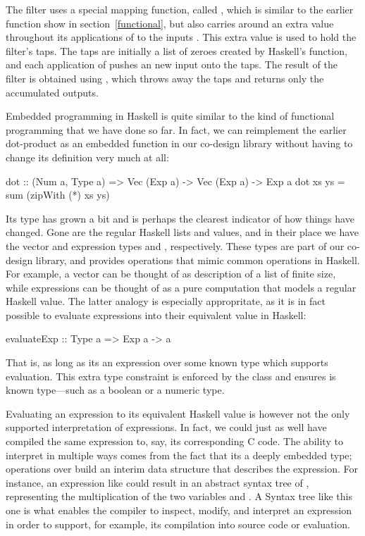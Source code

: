 \documentclass[../main.tex]{subfiles}
\begin{document}
The filter uses a special mapping function, called , which is similar to the earlier  function show in section~\ref{functional}, but also carries around an extra value throughout its applications of  to the inputs . This extra value is used to hold the filter's taps. The taps are initially a list of zeroes created by Haskell's  function, and each application of  pushes an new input onto the taps. The result of the filter is obtained using , which throws away the taps and returns only the accumulated outputs.

Embedded programming in Haskell is quite similar to the kind of functional programming that we have done so far. In fact, we can reimplement the earlier dot-product as an embedded function in our co-design library without having to change its definition very much at all:

\begin{code}
dot :: (Num a, Type a) => Vec (Exp a) -> Vec (Exp a) -> Exp a
dot xs ys = sum (zipWith (*) xs ys)
\end{code}

\noindent Its type has grown a bit and is perhaps the clearest indicator of how things have changed. Gone are the regular Haskell lists and values, and in their place we have the vector and expression types  and , respectively. These types are part of our co-design library, and provides operations that mimic common operations in Haskell. For example, a vector can be thought of as description of a list of finite size, while expressions can be thought of as a pure computation that models a regular Haskell value. The latter analogy is especially appropritate, as it is in fact possible to evaluate expressions into their equivalent value in Haskell:

\begin{code}
evaluateExp :: Type a => Exp a -> a
\end{code}

\noindent That is, as long as its an expression over some known type  which supports evaluation. This extra type constraint is enforced by the  class and ensures  is known type---such as a boolean or a numeric type.

Evaluating an expression to its equivalent Haskell value is however not the only supported interpretation of expressions. In fact, we could just as well have compiled the same expression to, say, its corresponding C code. The ability to interpret  in multiple ways comes from the fact that its a deeply embedded type; operations over  build an interim data structure that describes the expression. For instance, an expression like  could result in an abstract syntax tree of , representing the multiplication of the two variables  and . A Syntax tree like this one is what enables the compiler to inspect, modify, and interpret an expression in order to support, for example, its compilation into source code or evaluation.
\end{document}
